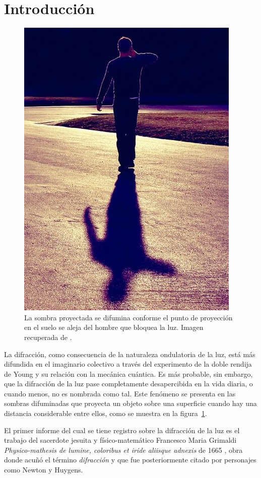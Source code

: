 \section{Introducción}
\begin{figure}[H]
	\centering
	\includegraphics[width=.6\linewidth]{Imagenes/blurry_shadow}
	\caption{La sombra proyectada se difumina conforme el punto de proyección en el suelo se aleja del hombre que bloquea la luz. Imagen recuperada de \parencite{blurry_shadow}.}
	\label{fig: blurry}
\end{figure}
La difracción, como consecuencia de la naturaleza ondulatoria de la luz, está más difundida en el imaginario colectivo a través del experimento de la doble rendija de Young y su relación con la mecánica cuántica.
Es más probable, sin embargo, que la difracción de la luz pase completamente desapercibida en la vida diaria, o cuando menos, no es nombrada como tal.  Este fenómeno se presenta en las sombras difuminadas que proyecta un objeto sobre una superficie cuando hay una distancia considerable entre ellos, como se muestra en la figura~\ref{fig: blurry}. 

El primer informe del cual se tiene registro sobre la difracción de la luz es el trabajo del sacerdote jesuita y físico-matemático Francesco Maria Grimaldi \textit{Physico-mathesis de lumine, coloribus et iride aliisque adnexis} de 1665 \parencite{Grimaldi}, obra donde acuñó el término \emph{difracción} y que fue posteriormente citado por personajes como Newton y Huygens.


